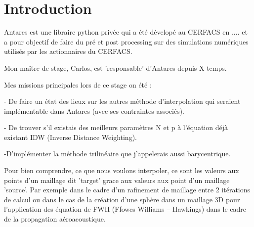 \section*{Introduction}



Antares est une libraire python privée qui a été dévelopé au CERFACS en .... et a pour objectif de faire du pré et post processing sur 
des simulations numériques utilisés par les actionnaires du CERFACS.

Mon maître de stage, Carlos, est 'responsable' d'Antares depuis X temps. 

Mes missions principales lors de ce stage on été :

- De faire un état des lieux sur les autres méthode d'interpolation qui seraient 
implémentable dans Antares (avec ses contraintes associés).


- De trouver s'il existais des meilleurs paramètres N et p à l'équation déjà existant IDW (Inverse Distance Weighting).

 -D'implémenter la méthode trilinéaire que j'appelerais aussi barycentrique.

 Pour bien comprendre, ce que nous voulons interpoler, ce sont les valeurs aux points d'un maillage dit 'target' grace aux valeurs aux point d'un maillage 'source'. Par exemple dans le cadre d'un rafinement de maillage entre 2 itérations de calcul ou dans le cas de la création d'une sphère dans un maillage 3D pour l'application des équation de FWH (Ffowcs Williams – Hawkings) dans le cadre de la propagation aéroacoustique.